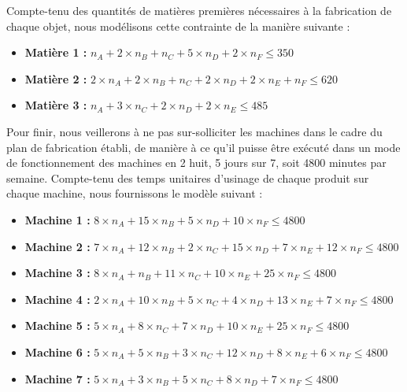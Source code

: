 \documentclass[a4paper,10pt]{article}
\begin{document}
Compte-tenu des quantités de matières premières nécessaires à la fabrication de chaque objet, nous modélisons cette contrainte de la manière suivante :
\newline
\begin{itemize}
\item[\textbullet]  \textbf{Matière 1 :} $n_A + 2 \times n_B + n_C + 5 \times n_D + 2 \times n_F \leq 350$
\item[\textbullet]  \textbf{Matière 2 :} $2 \times n_A + 2 \times n_B + n_C + 2 \times n_D + 2 \times n_E + n_F \leq 620$
\item[\textbullet]  \textbf{Matière 3 :} $n_A + 3 \times n_C + 2 \times n_D + 2 \times n_E \leq 485$\newline
\end{itemize}

Pour finir, nous veillerons à ne pas sur-solliciter les machines dans le cadre du plan de fabrication établi, de manière à ce qu'il puisse être exécuté dans un mode de fonctionnement des machines en 2 huit, 5 jours sur 7, soit 4800 minutes par semaine. Compte-tenu des temps unitaires d'usinage de chaque produit sur chaque machine, nous fournissons le modèle suivant :
\newline
\begin{itemize}
\item[\textbullet] \textbf{Machine 1 :} $8 \times n_A + 15 \times n_B + 5 \times n_D + 10 \times n_F \leq 4800$
\item[\textbullet] \textbf{Machine 2 :} $7 \times n_A + 12 \times n_B +2 \times n_C + 15 \times n_D + 7 \times n_E + 12 \times n_F \leq 4800$
\item[\textbullet] \textbf{Machine 3 :} $8 \times n_A + n_B + 11 \times n_C + 10 \times n_E + 25 \times n_F \leq 4800$
\item[\textbullet] \textbf{Machine 4 :} $2 \times n_A + 10 \times n_B + 5 \times n_C + 4 \times n_D + 13 \times n_E + 7 \times n_F \leq 4800$
\item[\textbullet] \textbf{Machine 5 :} $5 \times n_A + 8 \times n_C + 7 \times n_D + 10 \times n_E + 25 \times n_F \leq 4800$
\item[\textbullet] \textbf{Machine 6 :} $5 \times n_A + 5 \times n_B + 3 \times n_C + 12 \times n_D + 8 \times n_E + 6 \times n_F \leq 4800$
\item[\textbullet] \textbf{Machine 7 :} $5 \times n_A + 3 \times n_B +5 \times n_C +8 \times n_D + 7 \times n_F \leq 4800 $\newline
\end{itemize}
\end{document}
